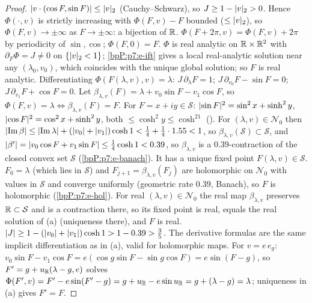 \begin{proof}
\label{stepP:p7:rk-mono} $\lvert v\cdot(\cos F,\sin F)\rvert\le\lvert v\rvert_2$ (Cauchy--Schwarz), so $J\ge1-\lvert v\rvert_2>0$. Hence $\Phi(\cdot,v)$ is strictly increasing with $\Phi(F,v)-F$ bounded ($\le\lvert v\rvert_2$), so $\Phi(F,v)\to\pm\infty$ as $F\to\pm\infty$: a bijection of $\mathbb{R}$. $\Phi(F+2\pi,v)=\Phi(F,v)+2\pi$ by periodicity of $\sin,\cos$; $\Phi(F,0)=F$.
\label{stepP:p7:rk-an} $\Phi$ is real analytic on $\mathbb{R}\times\mathbb{R}^2$ with $\partial_F\Phi=J\ne0$ on $\{\lvert v\rvert_2<1\}$; \ref{bpP:p7:e-ift} gives a local real-analytic solution near any $(\lambda_0,v_0)$, which coincides with the unique global solution; so $F$ is real analytic. Differentiating $\Phi(F(\lambda,v),v)=\lambda$: $J\,\partial_\lambda F=1$; $J\,\partial_{v_0}F-\sin F=0$; $J\,\partial_{v_1}F+\cos F=0$.
\label{stepP:p7:rk-contr} Let $\beta_{\lambda,v}(F)=\lambda+v_0\sin F-v_1\cos F$, so $\Phi(F,v)=\lambda\iff\beta_{\lambda,v}(F)=F$. For $F=x+iy\in\mathcal S$: $\lvert \sin F\rvert^2=\sin^2x+\sinh^2y$, $\lvert \cos F\rvert^2=\cos^2x+\sinh^2y$, both $\le\cosh^2y\le\cosh^21$ (). For $(\lambda,v)\in\mathcal N_0$ then $\lvert \operatorname{Im}\beta\rvert\le\lvert \operatorname{Im}\lambda\rvert+(\lvert v_0\rvert+\lvert v_1\rvert)\cosh1<\frac14+\frac14\cdot1.55<1$, so $\beta_{\lambda,v}(\mathcal S)\subset\mathcal S$, and $\lvert \beta'\rvert=\lvert v_0\cos F+v_1\sin F\rvert\le\frac14\cosh1<0.39$, so $\beta_{\lambda,v}$ is a $0.39$-contraction of the closed convex set $\mathcal S$ (\ref{bpP:p7:e-banach}). It has a unique fixed point $F(\lambda,v)\in\mathcal S$.
\label{stepP:p7:rk-hol} $F_0=\lambda$ (which lies in $\mathcal S$) and $F_{j+1}=\beta_{\lambda,v}(F_j)$ are holomorphic on $\mathcal N_0$ with values in $\mathcal S$ and converge uniformly (geometric rate $0.39$, Banach), so $F$ is holomorphic (\ref{bpP:p7:e-hol}). For real $(\lambda,v)\in\mathcal N_0$ the real map $\beta_{\lambda,v}$ preserves $\mathbb{R}\subset\mathcal S$ and is a contraction there, so its fixed point is real, equals the real solution of (a) (uniqueness there), and $F$ is real. $\lvert J\rvert\ge1-(\lvert v_0\rvert+\lvert v_1\rvert)\cosh1>1-0.39>\frac35$. The derivative formulas are the same implicit differentiation as in (a), valid for holomorphic maps.
\label{stepP:p7:rk-rel} For $v=e\,e_g$: $v_0\sin F-v_1\cos F=e(\cos g\sin F-\sin g\cos F)=e\sin(F-g)$, so $F'=g+u_{\mathbb{R}}(\lambda-g,e)$ solves $\Phi(F',v)=F'-e\sin(F'-g)=g+u_{\mathbb{R}}-e\sin u_{\mathbb{R}}=g+(\lambda-g)=\lambda$; uniqueness in (a) gives $F'=F$.
\end{proof}

